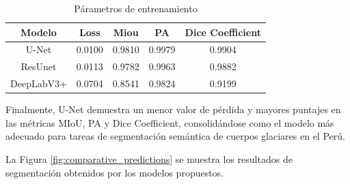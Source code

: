 
\begin{table}[h!]
	\centering
	\begin{tabular}{|c|c|c|c|c|}
		\hline
		\textbf{Modelo} & \textbf{Loss} &\textbf{Miou} & \textbf{PA} & \textbf{Dice Coefficient}\\
		\hline
		U-Net  & 0.0100 & 0.9810 & 0.9979 & 0.9904  \\
		ResUnet   & 0.0113 & 0.9782 & 0.9963 & 0.9882 \\
		DeepLabV3+ & 0.0704 & 0.8541 & 0.9824  & 0.9199 \\
		
		\hline
	\end{tabular}
	\caption{Párametros de entrenamiento}
	\label{tabla3}
\end{table}

Finalmente, U-Net demuestra un menor valor de pérdida y mayores puntajes en las métricas MIoU, PA y Dice Coefficient, consolidándose como el modelo más adecuado para tareas de segmentación semántica de cuerpos glaciares en el Perú.

La Figura \ref{fig:comparative_predictions} se muestra los resultados de segmentación obtenidos por los modelos propuestos. %


